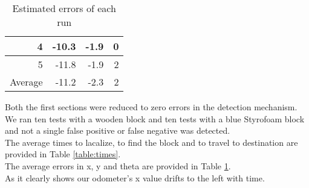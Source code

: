 \documentclass[letterpaper,12pt]{article}
\begin{document}
{\begin{table}[h]
\begin{tabular}{|r|r|r|r|}
    4       & -10.3              & -1.9                  & 0                         \\ \hline
    5       & -11.8              & -1.9                  & 2                         \\ \hline
    Average & -11.2              & -2.3                  & 2                         \\ \hline
    \end{tabular}
    \caption {Estimated errors of each run}
    \label{table:errors}
\end{table}
\clearpage
\noindent
Both the first sections were reduced to zero errors in the detection mechanism. We ran ten tests with a wooden block and ten tests with a blue Styrofoam block and not a single false positive or false negative was detected.\\
The average times to lacalize, to find the block and to travel to destination are provided in Table \ref{table:times}.\\
The average errors in x, y and theta are provided in Table \ref{table:errors}.\\
As it clearly shows our odometer's x value drifts to the left with time.
}
\end{document}
